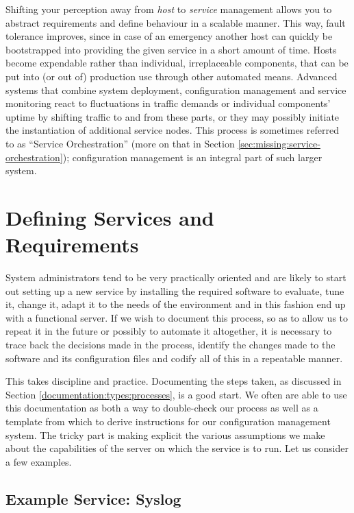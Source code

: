 Shifting your perception away from {\em host} to {\em
service} management allows you to abstract
requirements and define behaviour in a scalable
manner.  This way, fault tolerance improves, since in
case of an emergency another host can quickly be
bootstrapped into providing the given service in a
short amount of time.  Hosts become expendable rather
than individual, irreplaceable components, that can be
put into (or out of) production use through other
automated means.  Advanced systems that combine system
deployment, configuration management and service
monitoring react to fluctuations in traffic demands or
individual components' uptime by shifting traffic to
and from these parts, or they may possibly initiate
the instantiation of additional service nodes.  This
process is sometimes referred to as ``Service
Orchestration'' (more on
that in Section
\ref{sec:missing:service-orchestration});
configuration management is an integral part of such
larger system.

\section{Defining Services and Requirements}
\label{configuration-management:defining-services}

System administrators tend to be very practically
oriented and are likely to start out setting up a new
service by installing the required software to
evaluate, tune it, change it, adapt it to the needs of
the environment and in this fashion end up with a
functional server.  If we wish to document this
process, so as to allow us to repeat it in the future
or possibly to automate it altogether, it is necessary
to trace back the decisions made in the process,
identify the changes made to the software and its
configuration files and codify all of this in a
repeatable manner.

This takes discipline and practice.  Documenting the
steps taken, as discussed in Section
\ref{documentation:types:processes}, is a good start.
We often are able to use this documentation as both a
way to double-check our process as well as a template
from which to derive instructions for our
configuration management system.  The tricky part is
making explicit the various assumptions we make about
the capabilities of the server on which the service is
to run.  Let us consider a few examples.

\subsection{Example Service: Syslog}
\label{configuration-management:defining-services:syslog}

